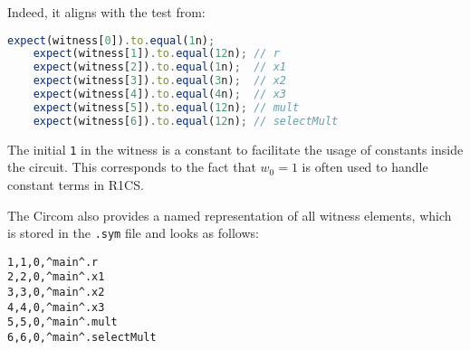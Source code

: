 \documentclass[../lecture-notes-105x135.tex]{subfiles}
\begin{document}
    Indeed, it aligns with the test from:

    \begin{center}
        \begin{tcolorbox}[enhanced,
            width=0.75\textwidth,
            title={\textbf{test/Math.witness.test.ts}},
            coltitle=gray!25!black,
            attach boxed title to top center={yshift=-2mm,yshifttext=-1mm},
            boxed title style={size=small,colframe=gray!75!black,
            colback=Green!30!white,boxrule=1pt},
            top=-0.3cm,
            bottom=-0.3cm]
            \begin{lstlisting}[language=TypeScript,numbers=none,basicstyle=\ttfamily\footnotesize]
    expect(witness[0]).to.equal(1n);
    expect(witness[1]).to.equal(12n); // r
    expect(witness[2]).to.equal(1n);  // x1
    expect(witness[3]).to.equal(3n);  // x2
    expect(witness[4]).to.equal(4n);  // x3
    expect(witness[5]).to.equal(12n); // mult
    expect(witness[6]).to.equal(12n); // selectMult
            \end{lstlisting}
        \end{tcolorbox}
    \end{center}

    The initial \texttt{1} in the witness is a constant to facilitate the usage of constants inside the circuit.
    This corresponds to the fact that $w_0=1$ is often used to handle constant terms in R1CS.

    The Circom also provides a named representation of all witness elements, which is stored in the \texttt{.sym} file and looks as follows:

    \begin{center}
        \begin{tcolorbox}[enhanced,
            width=0.5\textwidth,
            title=\textbf{.sym file for $x_1? \; x_2 \times x_3: x_2+x_3$},
            coltitle=gray!25!black,
            attach boxed title to top center={yshift=-2mm,yshifttext=-1mm},
            boxed title style={size=small,colframe=gray!75!black,
            colback=blue!30!white,boxrule=1pt},
            top=-0.35cm,
            bottom=-0.35cm]
            \begin{lstlisting}[language=Circom,numbers=none,basicstyle=\ttfamily\footnotesize,escapechar=^]
1,1,0,^main^.r
2,2,0,^main^.x1
3,3,0,^main^.x2
4,4,0,^main^.x3
5,5,0,^main^.mult
6,6,0,^main^.selectMult
            \end{lstlisting}
        \end{tcolorbox}
    \end{center}
\end{document}
